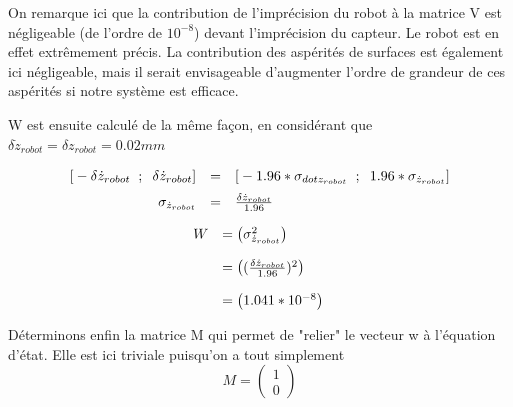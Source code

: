 \documentclass[12pt,twoside,a4paper]{article}
\begin{document}
On remarque ici que la contribution de l'imprécision du robot à la matrice V est négligeable (de l'ordre de $10^{-8}$) devant l'imprécision du capteur. Le robot est en effet extrêmement précis. La contribution des aspérités de surfaces est également ici négligeable, mais il serait envisageable d'augmenter l'ordre de grandeur de ces aspérités si notre système est efficace.



\vspace{2cm}

W est ensuite calculé de la même façon, en considérant que $\delta \dot{z}_{robot} = \delta z_{robot} = 0.02mm$

$$
\begin{array}{rcl}
	\text{[} -\delta \dot{z}_{robot} \rule{2mm}{0pt}; \rule{2mm}{0pt} \delta \dot{z}_{robot} \text{]} &=& \text{[}-1.96*\sigma_{dot{z}_{robot}} \rule{2mm}{0pt}; \rule{2mm}{0pt} 1.96*\sigma_{\dot{z}_{robot}}  \text{]} \\
	\sigma_{\dot{z}_{robot}} &= & \frac{\delta\dot{z}_{robot}}{1.96} \rule{0pt}{15pt} \\
\end{array}
$$

$$
\begin{array}{ll}
W &=
\begin{pmatrix}
 \sigma_{\dot{z}_{robot}}^{2}
\end{pmatrix} \\
&=
\begin{pmatrix}
(\frac{\delta\dot{z}_{robot}}{1.96})^{2}
\end{pmatrix} \rule{0pt}{20pt} \\
&= \begin{pmatrix} 1.041*10^{-8} \end{pmatrix} \rule{0pt}{20pt} \\
\end{array}
$$

\vspace{0.5cm}

Déterminons enfin la matrice M qui permet de "relier" le vecteur w à l'équation d'état. Elle est ici triviale puisqu'on a tout simplement
$$
M =
\begin{pmatrix}
1 \\ 0
\end{pmatrix}
$$


\vspace{0.5cm}
\end{document}

